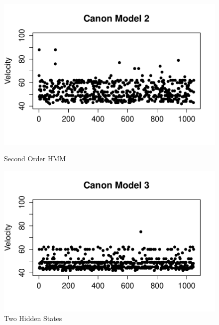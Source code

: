 \documentclass{article} %
\begin{document}
\begin{figure}[ht]
\begin{minipage}[b]{0.5\linewidth}
    \includegraphics[scale = 0.45]{CannonModel2Velocity.pdf} 
    \caption{Second Order HMM} 
    \vspace{4ex}
  \end{minipage}%
  \begin{minipage}[b]{0.5\linewidth}
    \centering
    \includegraphics[scale = 0.45]{CannonModel3Velocity.pdf} 
    \caption{Two Hidden States} 
    \vspace{4ex}
  \end{minipage} 
\end{figure}

\newpage
\end{document}

